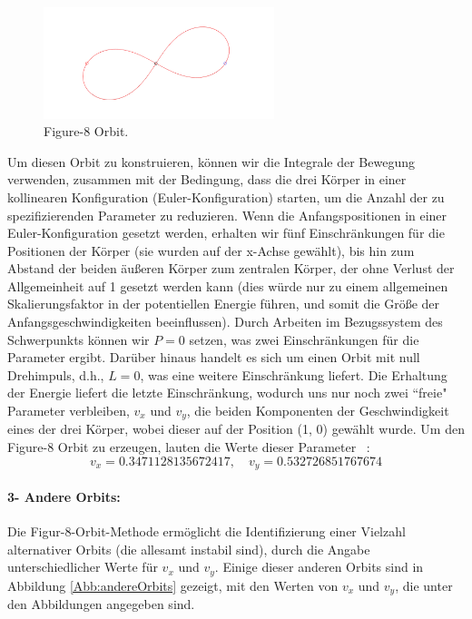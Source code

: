 \documentclass[a4paper,12pt,twoside]{article}
\begin{document}
\begin{figure}[H]
    \centering
    \includegraphics[width=0.6\textwidth]{figure8Orbit.png}
    \caption{Figure-8 Orbit.}
    \label{fig:figure8Orbit}
\end{figure}

Um diesen Orbit zu konstruieren, können wir die Integrale der Bewegung verwenden, 
zusammen mit der Bedingung, dass die drei Körper in einer kollinearen Konfiguration (Euler-Konfiguration) starten, um die Anzahl der zu spezifizierenden Parameter zu reduzieren. 
Wenn die Anfangspositionen in einer Euler-Konfiguration gesetzt werden, erhalten wir fünf Einschränkungen für die Positionen der Körper (sie wurden auf der x-Achse gewählt), bis hin zum Abstand der beiden äußeren Körper zum zentralen Körper, der ohne Verlust der Allgemeinheit auf 1 gesetzt werden kann (dies würde nur zu einem allgemeinen Skalierungsfaktor in der potentiellen Energie führen, und somit die Größe der Anfangsgeschwindigkeiten beeinflussen). 
Durch Arbeiten im Bezugssystem des Schwerpunkts können wir $P = 0$ setzen, was zwei Einschränkungen für die Parameter ergibt. Darüber hinaus handelt es sich um einen Orbit mit null Drehimpuls, d.h., $L = 0$, was eine weitere Einschränkung liefert. Die Erhaltung der Energie liefert die letzte Einschränkung, wodurch uns nur noch zwei ``freie" Parameter verbleiben, $v_x$ und $v_y$, die beiden Komponenten der Geschwindigkeit eines der drei Körper, wobei dieser auf der Position (1, 0) gewählt wurde. Um den Figure-8 Orbit zu erzeugen, lauten die Werte dieser Parameter ~\cite{Ramos2019}:
\begin{equation}
	v_x = 0.3471128135672417, \quad v_y = 0.532726851767674
	\label{ref1}
\end{equation}


\paragraph{3- Andere Orbits: } 
Die Figur-8-Orbit-Methode ermöglicht die Identifizierung einer Vielzahl alternativer Orbits (die allesamt instabil sind), durch die Angabe unterschiedlicher Werte für $v_x$ und $v_y$.
Einige dieser anderen Orbits sind in Abbildung \ref{Abb:andereOrbits} gezeigt, mit den Werten von $v_x$ und $v_y$, die unter den Abbildungen angegeben sind.
\end{document}
